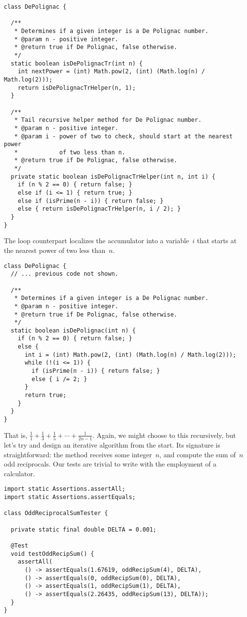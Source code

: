 \begin{lstlisting}[language=MyJava]
class DePolignac {
  
  /**
   * Determines if a given integer is a De Polignac number.
   * @param n - positive integer.
   * @return true if De Polignac, false otherwise.
   */
  static boolean isDePolignacTr(int n) {
    int nextPower = (int) Math.pow(2, (int) (Math.log(n) / Math.log(2)));
    return isDePolignacTrHelper(n, 1);
  }
  
  /**
   * Tail recursive helper method for De Polignac number.
   * @param n - positive integer.
   * @param i - power of two to check, should start at the nearest power
   *            of two less than n.
   * @return true if De Polignac, false otherwise.
   */
  private static boolean isDePolignacTrHelper(int n, int i) {
    if (n % 2 == 0) { return false; }
    else if (i <= 1) { return true; }
    else if (isPrime(n - i)) { return false; }
    else { return isDePolignacTrHelper(n, i / 2); }
  }
}
\end{lstlisting}

The loop counterpart localizes the accumulator into a variable~$i$ that starts at the nearest power of two less than~$n$.

\begin{lstlisting}[language=MyJava]
class DePolignac {
  // ... previous code not shown.

  /**
   * Determines if a given integer is a De Polignac number.
   * @param n - positive integer.
   * @return true if De Polignac, false otherwise.
   */
  static boolean isDePolignac(int n) {
    if (n % 2 == 0) { return false; }
    else {
      int i = (int) Math.pow(2, (int) (Math.log(n) / Math.log(2)));
      while (!(i <= 1)) {
        if (isPrime(n - i)) { return false; }
        else { i /= 2; }
      }
      return true;
    }
  }
}
\end{lstlisting}

That is, $\frac{1}{1} + \frac{1}{3} + \frac{1}{5} + \cdots + \frac{1}{2n-1}$. 
Again, we might choose to this recursively, but let's try and design an iterative algorithm from the start.
Its signature is straightforward: the method receives some integer~$n$, and compute the sum of~$n$ odd reciprocals. 
Our tests are trivial to write with the employment of a calculator.

\begin{lstlisting}[language=MyJava]
import static Assertions.assertAll;
import static Assertions.assertEquals;

class OddReciprocalSumTester {

  private static final double DELTA = 0.001;

  @Test
  void testOddRecipSum() {
    assertAll(
      () -> assertEquals(1.67619, oddRecipSum(4), DELTA),
      () -> assertEquals(0, oddRecipSum(0), DELTA),
      () -> assertEquals(1, oddRecipSum(1), DELTA),
      () -> assertEquals(2.26435, oddRecipSum(13), DELTA));
  }
}
\end{lstlisting}

